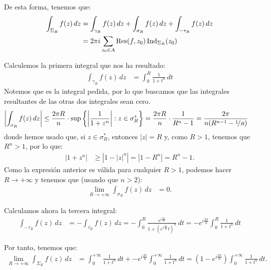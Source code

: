 \begin{ejercicio}
    De esta forma, tenemos que:
    \begin{align*}
        \int_{\Sigma_R} f(z) \, dz &= \int_{\gamma_R} f(z) \, dz + \int_{\sigma_R} f(z) \, dz + \int_{-\tau_R} f(z) \, dz \\
        &= 2\pi i\sum_{z_0\in A}\operatorname{Res}(f,z_0)\operatorname{Ind}_{\Sigma_R}(z_0)
    \end{align*}

    Calculemos la primera integral que nos ha resultado:
    \begin{align*}
        \int_{\gamma_R} f(z) \, dz &= \int_{0}^{R} \frac{1}{1 + t^n} \, dt
    \end{align*}
    Notemos que es la integral pedida, por lo que buscamos que las integrales resultantes de las otras dos integrales sean cero.
    \begin{align*}
        \left| \int_{\sigma_R} f(z) \, dz \right|
        &\leq \frac{2\pi R}{n}\cdot \sup\left\{\left|\dfrac{1}{1 + z^n}\right| : z\in \sigma_R^*\right\}
        = \frac{2\pi R}{n}\cdot \frac{1}{R^n - 1}
        = \frac{2\pi}{n(R^{n-1} - \nicefrac{1}{R})}
    \end{align*}
    donde hemos usado que, si $z\in \sigma_R^*$, entonces $|z|=R$ y, como $R>1$, tenemos que $R^n>1$, por lo que:
    \begin{align*}
        |1 + z^n| &\geq \left|1- |z|^n\right| = \left|1 - R^n\right| = R^n - 1.
    \end{align*}
    Como la expresión anterior es válida para cualquier $R > 1$, podemos hacer $R \to +\infty$ y tenemos que (usando que $n > 2$):
    \begin{align*}
        \lim_{R\to+\infty} \int_{\sigma_R} f(z) \, dz &= 0.
    \end{align*}

    Calculamos ahora la tercera integral:
    \begin{align*}
        \int_{-\tau_R} f(z) \, dz &= -\int_{\tau_R} f(z) \, dz
        = -\int_{0}^{R} \frac{e^{i\frac{2\pi}{n}}}{1 + (e^{i\frac{2\pi}{n}}t)^n} \, dt
        = -e^{i\frac{2\pi}{n}}\int_{0}^{R} \frac{1}{1 + t^n} \, dt
    \end{align*}

    Por tanto, tenemos que:
    \begin{align*}
        \lim_{R\to+\infty} \int_{\Sigma_R} f(z) \, dz &= \int_{0}^{+\infty} \frac{1}{1 + t^n} \, dt + - e^{i\frac{2\pi}{n}}\int_{0}^{+\infty} \frac{1}{1 + t^n} \, dt
        = \left(1 - e^{i\frac{2\pi}{n}}\right)\int_{0}^{+\infty} \frac{1}{1 + t^n} \, dt.
    \end{align*}


\end{ejercicio}
